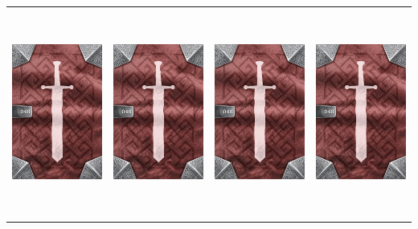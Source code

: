 \documentclass{minimal}
\begin{document}
{\begin{longtable}{llll}
\includegraphics[width=44mm,height=68mm]{./43-49/gh-048-major-mana-potion-back.png} &
\includegraphics[width=44mm,height=68mm]{./43-49/gh-048-major-mana-potion-back.png} &
\includegraphics[width=44mm,height=68mm]{./43-49/gh-048-major-mana-potion-back.png} &
\includegraphics[width=44mm,height=68mm]{./43-49/gh-048-major-mana-potion-back.png}\\ 

\end{longtable}}
\end{document}
